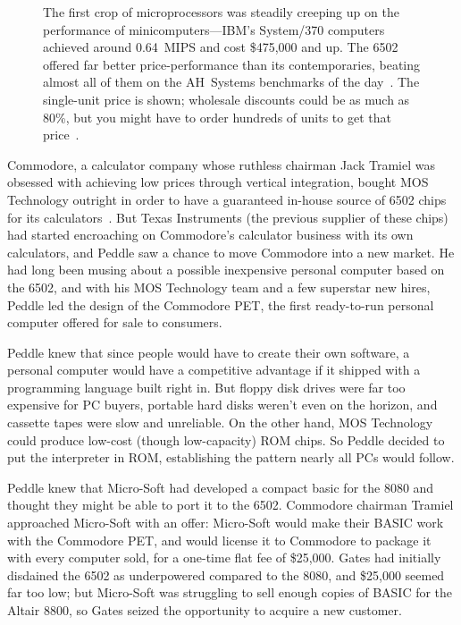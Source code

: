 \begin{figure}
  
  \caption{\label{fig:price_performance} 
    The first crop of microprocessors was steadily creeping up on the
    performance of minicomputers---IBM's System/370 computers achieved
    around 0.64~MIPS and cost \$475,000 and up.
    The 6502 offered far better
    price-performance than its contemporaries,
    beating almost all of them on the AH~Systems benchmarks of
    the day~\cite{edn75:6502}.  
    The single-unit price is shown; wholesale discounts could be
    as much as 80\%, but you might have to order hundreds of units to
    get that price~\cite[p. 228]{ceruzzi}.}
\end{figure}



Commodore, a calculator company whose ruthless chairman Jack Tramiel was
obsessed with achieving low prices through vertical integration, bought
MOS Technology outright in order to have a guaranteed in-house source of
6502 chips for its calculators~\cite{commodore}.
But Texas Instruments (the previous supplier of these chips) had started
encroaching on Commodore's calculator business with its own calculators,
and Peddle saw a chance to move Commodore into a new market.
He had long been musing about a possible inexpensive personal computer
based on the 6502, and with his MOS Technology team and a few superstar
new hires, Peddle led the design of the Commodore PET, 
the first ready-to-run personal computer offered for sale to consumers.

Peddle knew that since people would have to create their own software, a
personal computer would have a competitive advantage if it shipped with
a programming language built right in.
But floppy disk drives were far too expensive for PC buyers, portable
hard disks weren't even on the horizon, and cassette tapes were slow and
unreliable.  On the other hand, MOS Technology could produce low-cost
(though low-capacity) ROM 
chips.  So Peddle decided to  put the interpreter in ROM, establishing
the pattern nearly all PCs would follow.

Peddle knew that Micro-Soft had developed a compact basic for the 8080
and thought they might be able to port it to the 6502.
Commodore chairman Tramiel approached Micro-Soft with an offer:
Micro-Soft would make their BASIC work with the Commodore PET, and would
license it to Commodore to package it with every computer sold, for a
one-time flat fee of \$25,000.
Gates had initially disdained the 6502 as underpowered compared to the
8080, and \$25,000 seemed far too low; but Micro-Soft was struggling to
sell enough copies of BASIC for the Altair 8800, so Gates
seized the opportunity to acquire a new customer.


